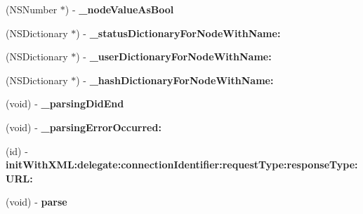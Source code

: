\begin{DoxyCompactItemize}
\item 
\hypertarget{interface_m_g_twitter_lib_x_m_l_parser_a2e5c6df853ae2739331a30e5b36ae274}{
(\-N\-S\-Number $\ast$) -\/ {\bfseries \-\_\-node\-Value\-As\-Bool}}
\label{interface_m_g_twitter_lib_x_m_l_parser_a2e5c6df853ae2739331a30e5b36ae274}

\item 
\hypertarget{interface_m_g_twitter_lib_x_m_l_parser_aa84aae44373ad61c1f85e4a29efe079b}{
(\-N\-S\-Dictionary $\ast$) -\/ {\bfseries \-\_\-status\-Dictionary\-For\-Node\-With\-Name\-:}}
\label{interface_m_g_twitter_lib_x_m_l_parser_aa84aae44373ad61c1f85e4a29efe079b}

\item 
\hypertarget{interface_m_g_twitter_lib_x_m_l_parser_a3595d2b416e47f39ef9098724a8319cf}{
(\-N\-S\-Dictionary $\ast$) -\/ {\bfseries \-\_\-user\-Dictionary\-For\-Node\-With\-Name\-:}}
\label{interface_m_g_twitter_lib_x_m_l_parser_a3595d2b416e47f39ef9098724a8319cf}

\item 
\hypertarget{interface_m_g_twitter_lib_x_m_l_parser_aff1cbb6ad4febd7695040edf4e65d263}{
(\-N\-S\-Dictionary $\ast$) -\/ {\bfseries \-\_\-hash\-Dictionary\-For\-Node\-With\-Name\-:}}
\label{interface_m_g_twitter_lib_x_m_l_parser_aff1cbb6ad4febd7695040edf4e65d263}

\item 
\hypertarget{interface_m_g_twitter_lib_x_m_l_parser_a02eebd16b0614f05dc0039c370b6e69c}{
(void) -\/ {\bfseries \-\_\-parsing\-Did\-End}}
\label{interface_m_g_twitter_lib_x_m_l_parser_a02eebd16b0614f05dc0039c370b6e69c}

\item 
\hypertarget{interface_m_g_twitter_lib_x_m_l_parser_a9f2db40c3543e2e02f095d8af1a4001a}{
(void) -\/ {\bfseries \-\_\-parsing\-Error\-Occurred\-:}}
\label{interface_m_g_twitter_lib_x_m_l_parser_a9f2db40c3543e2e02f095d8af1a4001a}

\item 
\hypertarget{interface_m_g_twitter_lib_x_m_l_parser_acc0666cd7ace21f35d0a1be69354f527}{
(id) -\/ {\bfseries init\-With\-X\-M\-L\-:delegate\-:connection\-Identifier\-:request\-Type\-:response\-Type\-:\-U\-R\-L\-:}}
\label{interface_m_g_twitter_lib_x_m_l_parser_acc0666cd7ace21f35d0a1be69354f527}

\item 
\hypertarget{interface_m_g_twitter_lib_x_m_l_parser_a8868f9b8f95ee8ee3d23655e331ef0a2}{
(void) -\/ {\bfseries parse}}
\label{interface_m_g_twitter_lib_x_m_l_parser_a8868f9b8f95ee8ee3d23655e331ef0a2}


\end{DoxyCompactItemize}
